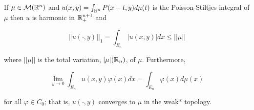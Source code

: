 \begin{theorem}\label{thm:2.3}
    If $\mu\in\mathcal M(\mathbb R^{n})$ and $u(x,y)=\int_{\mathbb R^n}P(x-t,y)d\mu(t)$ is the Poisson-Stiltjes integral of $\mu$ then $u$ is harmonic in $\mathbb R_+^{n+1}$ and 

    \begin{equation}\label{eq:main-ineq}
        ||u(\cdot,y)||_1=\int_{E_n}|u(x,y)|dx\leq||\mu||
    \end{equation}

    \noindent where $||\mu||$ is the total variation, $|\mu|(\mathbb R_n)$, of $\mu$. Furthermore,

    \begin{equation}\label{eq:main-convergence}
        \lim_{y\rightarrow0}\int_{E_n}u(x,y)\varphi(x)dx=\int_{E_n}\varphi(x)d\mu(x)
    \end{equation}

    \noindent for all $\varphi\in C_0$; that is, $u(\cdot,y)$ converges to $\mu$ in the weak* topology.
\end{theorem}
